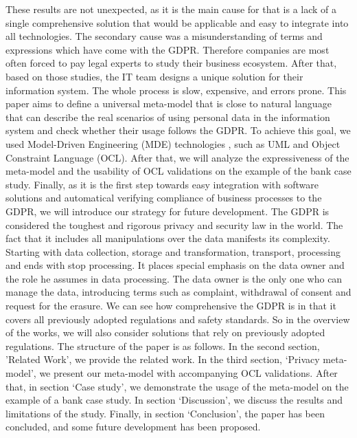 \documentclass[11pt,english]{article}
\begin{document}
\newline These results are not unexpected, as it is the main cause for that is a lack of a single comprehensive solution that would be applicable and easy to integrate into all technologies. The secondary cause was a misunderstanding of terms and expressions which have come with the GDPR. Therefore companies are most often forced to pay legal experts to study their business ecosystem. After that, based on those studies, the IT team designs a unique solution for their information system. The whole process is slow, expensive, and errors prone. \newline This paper aims to define a universal meta-model that is close to natural language that can describe the real scenarios of using personal data in the information system and check whether their usage follows the GDPR. To achieve this goal, we used Model-Driven Engineering (MDE) technologies \cite{mde}, such as UML \cite{uml} and Object Constraint Language (OCL). After that, we will analyze the expressiveness of the meta-model and the usability of OCL validations on the example of the bank case study. Finally, as it is the first step towards easy integration with software solutions and automatical verifying compliance of business processes to the GDPR, we will introduce our strategy for future development. \newline The GDPR is considered the toughest and rigorous privacy and security law in the world.  The fact that it includes all manipulations over the data manifests its complexity. Starting with data collection, storage and transformation, transport, processing and ends with stop processing. It places special emphasis on the data owner and the role he assumes in data processing. The data owner is the only one who can manage the data, introducing terms such as complaint, withdrawal of consent and request for the erasure. We can see how comprehensive the GDPR is in that it covers all previously adopted regulations and safety standards. So in the overview of the works, we will also consider solutions that rely on previously adopted regulations. \newline The structure of the paper is as follows. In the second section, 'Related Work', we provide the related work. In the third section, ‘Privacy meta-model’, we present our meta-model with accompanying OCL validations. After that, in section ‘Case study’, we demonstrate the usage of the meta-model on the example of a bank case study. In section ‘Discussion’,  we discuss the results and limitations of the study. Finally, in section ‘Conclusion’, the paper has been concluded, and some future development has been proposed.
\end{document}
